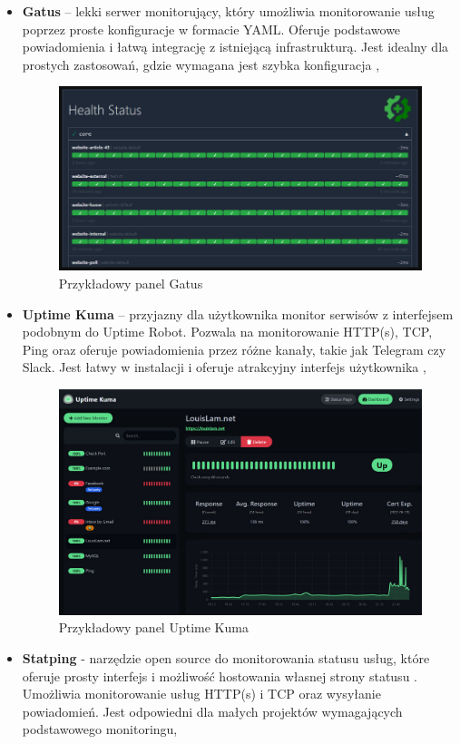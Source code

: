 \documentclass{article}
\begin{document}
\begin{itemize}
    \item \textbf{Gatus} – lekki serwer monitorujący, który umożliwia monitorowanie usług poprzez proste konfiguracje w formacie YAML. Oferuje podstawowe powiadomienia i łatwą integrację z istniejącą infrastrukturą. Jest idealny dla prostych zastosowań, gdzie wymagana jest szybka konfiguracja \cite{GatusGithub},

\begin{figure}[H]
    \centering
    \includegraphics[width=0.5\linewidth]{przykladGatus.png}
    \caption{Przykładowy panel Gatus}
    \label{fig:enter-label}
\end{figure}

    \item \textbf{Uptime Kuma} – przyjazny dla użytkownika monitor serwisów z interfejsem podobnym do Uptime Robot. Pozwala na monitorowanie HTTP(s), TCP, Ping oraz oferuje powiadomienia przez różne kanały, takie jak Telegram czy Slack. Jest łatwy w instalacji i oferuje atrakcyjny interfejs użytkownika \cite{UptimeKumaGithub},

\begin{figure}[H]
    \centering
    \includegraphics[width=0.5\linewidth]{przykladKuma.png}
    \caption{Przykładowy panel Uptime Kuma}
    \label{fig:enter-label}
\end{figure}

    \item \textbf{Statping} - narzędzie open source do monitorowania statusu usług, które oferuje prosty interfejs i możliwość hostowania własnej strony statusu \cite{StatpingGithub}. Umożliwia monitorowanie usług HTTP(s) i TCP oraz wysyłanie powiadomień. Jest odpowiedni dla małych projektów wymagających podstawowego monitoringu,


\end{itemize}
\end{document}
